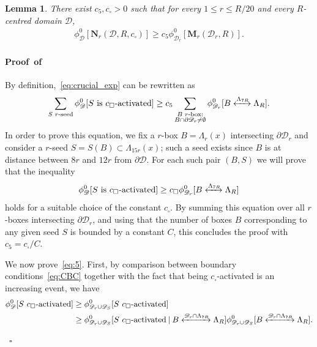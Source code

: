 \documentclass[a4paper,oneside,11pt]{article}
\newtheorem{lemma}[theorem]{Lemma}
\numberwithin{equation}{section}
\numberwithin{equation}{section}
\numberwithin{equation}{section}
\newenvironment{proof}[1][\relax]%
  {\paragraph{Proof\ifx#1\relax\else~of #1\fi}}%
  {~\hfill$\square$\par\bigskip}
\newcommand{\calD}{\mathcal{D}}
\newcommand{\La}{\Lambda}
\begin{document}
\begin{lemma}\label{lem:10}
	There exist $c_5,c_\square>0$ such that for every $1\le r\le R/20$ and every $R$-centred domain $\calD$, 
		\begin{align}\label{eq:crucial_exp}
	\phi_{\calD}^0[\mathbf N_{r}(\calD,R,c_\square)]
	\ge c_5\phi_{\calD_r}^0[\mathbf M_r(\calD_r,R)].
	\end{align}
\end{lemma}

\begin{proof}
By definition,~\eqref{eq:crucial_exp} can be rewritten as
  \begin{equation}
    \label{eq:1}
 \sum_{S\text{ $r$-seed}}\phi_{\calD}^0[S\text{ is $c_\square$-activated}]\ge c_5 \sum_{\substack{B\text{ $r$-box}:\\B\cap \partial \mathcal D_r\neq\emptyset}}\phi_{\calD_r}^0[B\xleftrightarrow{\Lambda_{7R}} \Lambda_R].
 \end{equation}
 In order to prove this equation, we fix a $r$-box $B=\La_r(x)$ intersecting $\partial \calD_r$ and consider a $r$-seed $S=S(B)\subset \Lambda_{15r}(x)$; such a seed exists since $B$ is at distance between $8r$ and $12r$ from $\partial\calD$.
 For each such pair $(B,S)$ we will prove  that the inequality 
 \begin{equation}
   \label{eq:5}
   \phi_{\calD}^0[S\text{ is $c_\square$-activated}]\ge c_\square\phi_{\calD_r}^0[B\xleftrightarrow{\Lambda_{7R}} \Lambda_R]
 \end{equation}
 holds for a suitable choice of the constant $c_\square$. 
 By summing this equation over all $r$-boxes intersecting $\partial \calD_r$, 
 and using that the number of boxes $B$ corresponding to any given seed $S$ is bounded by a constant $C$, 
 this concludes the proof with $c_5=c_\square/C$. 

We now prove~\eqref{eq:5}. First, by comparison between boundary conditions~\eqref{eq:CBC} together with the fact that being $c_\square$-activated is an increasing event, we have
 \begin{align}\label{eq:6}
   \phi_{\calD}^0[S\text{ $c_\square$-activated}]&\ge \phi_{\calD_r\cup\calD_S}^0[S\text{ $c_\square$-activated}]\\
   &\ge\phi_{\calD_r\cup\calD_S}^0[S\text{ $c_\square$-activated} \:|\:  B\xleftrightarrow{\calD_r\cap\Lambda_{7R}} \Lambda_R] \phi_{\calD_r\cup\calD_S}^0[B\xleftrightarrow{\calD_r\cap\Lambda_{7R}} \Lambda_R].\notag
\end{align}


\end{proof}
\end{document}

